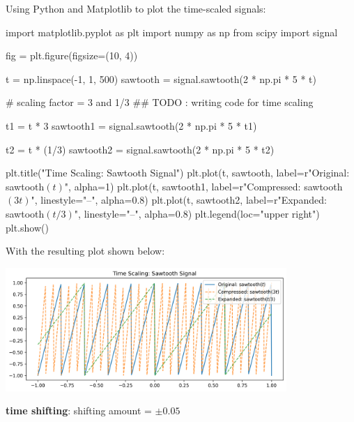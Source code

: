 \documentclass[a4paper, 10pt]{article}
\begin{document}
\begin{solution}
Using Python and Matplotlib to plot the time-scaled signals:
\begin{codingbox}
import matplotlib.pyplot as plt
import numpy as np
from scipy import signal

fig = plt.figure(figsize=(10, 4))

t = np.linspace(-1, 1, 500)
sawtooth = signal.sawtooth(2 * np.pi * 5 * t)

# scaling factor = 3 and 1/3
## TODO : writing code for time scaling

t1 = t * 3
sawtooth1 = signal.sawtooth(2 * np.pi * 5 * t1)

t2 = t * (1/3)
sawtooth2 = signal.sawtooth(2 * np.pi * 5 * t2)

plt.title("Time Scaling: Sawtooth Signal")
plt.plot(t, sawtooth, label=r"Original: sawtooth$(t)$", alpha=1)
plt.plot(t, sawtooth1, label=r"Compressed: sawtooth$(3t)$", linestyle="--", alpha=0.8)
plt.plot(t, sawtooth2, label=r"Expanded: sawtooth$(t/3)$", linestyle="--", alpha=0.8)
plt.legend(loc="upper right")
plt.show()
\end{codingbox}

With the resulting plot shown below:
\begin{center}
    \includegraphics[width=0.8\textwidth]{images/problem_6_1.png}
\end{center}
\end{solution}

\newpage

\begin{subproblems}[start=2]
    \item \textbf{time shifting}: shifting amount = \( \pm 0.05 \)
\end{subproblems}
\end{document}
